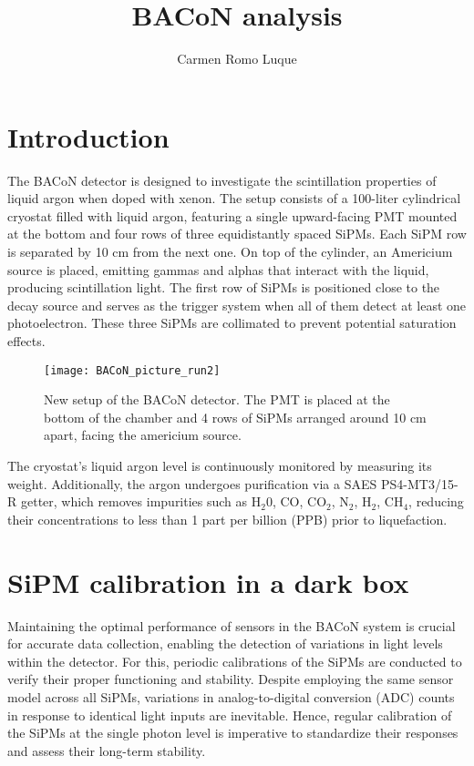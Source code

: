 \documentclass[11pt,a4paper,english,oneside, pdf]{article}
\title{BACoN analysis}
\author{Carmen Romo Luque}
\begin{document}
	\maketitle
	
	\section{Introduction}	 
	 The BACoN detector is designed to investigate the scintillation properties of liquid argon when doped with xenon. The setup consists of a 100-liter cylindrical cryostat filled with liquid argon, featuring a single upward-facing PMT mounted at the bottom and four rows of three equidistantly spaced SiPMs. Each SiPM row is separated by 10 cm from the next one. On top of the cylinder, an Americium source is placed, emitting gammas and alphas that interact with the liquid, producing scintillation light. The first row of SiPMs is positioned close to the decay source and serves as the trigger system when all of them detect at least one photoelectron. These three SiPMs are collimated to prevent potential saturation effects.
	 
	 	\begin{figure}[!h]
	 	\begin{center}
	 		\texttt{[image: BACoN\_picture\_run2]}
	 		\caption{New setup of the BACoN detector. The PMT is placed at the bottom of the chamber and 4 rows of SiPMs arranged around 10 cm apart, facing the americium source.}
	 		\label{fig:BACoN_picture_run2}
	 	\end{center}
	 \end{figure}
	 
	 The cryostat's liquid argon level is continuously monitored by measuring its weight. Additionally, the argon undergoes purification via a SAES PS4-MT3/15-R getter, which removes impurities such as H$_2$0, CO, CO$_2$, N$_2$, H$_2$, CH$_4$, reducing their concentrations to less than 1 part per billion (PPB) prior to liquefaction.
	 
	 
	 \clearpage
	
	\section{SiPM calibration in a dark box}
	\label{cal_dark_box}
	
	Maintaining the optimal performance of sensors in the BACoN system is crucial for accurate data collection, enabling the detection of variations in light levels within the detector. For this, periodic calibrations of the SiPMs are conducted to verify their proper functioning and stability. Despite employing the same sensor model across all SiPMs, variations in analog-to-digital conversion (ADC) counts in response to identical light inputs are inevitable. Hence, regular calibration of the SiPMs at the single photon level is imperative to standardize their responses and assess their long-term stability.
	
\end{document}
